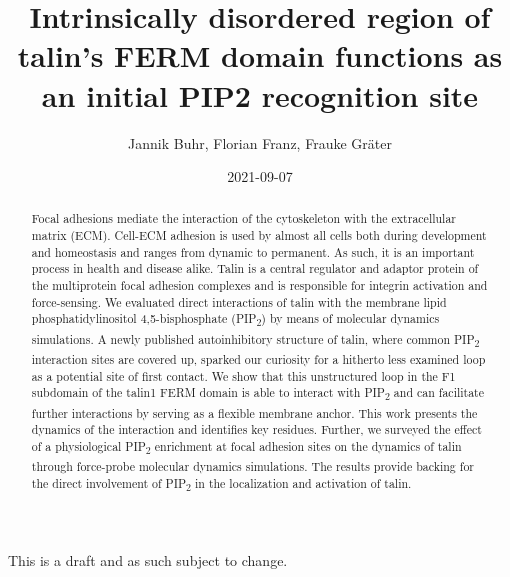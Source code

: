 \documentclass[
  letterpaper,
  DIV=11,
  numbers=noendperiod]{scrartcl}
\title{Intrinsically disordered region of talin's FERM domain functions
as an initial PIP2 recognition site}
\author{Jannik Buhr, Florian Franz, Frauke Gräter}
\date{2021-09-07}
\begin{document}
\maketitle
\begin{abstract}
Focal adhesions mediate the interaction of the cytoskeleton with the
extracellular matrix (ECM). Cell-ECM adhesion is used by almost all
cells both during development and homeostasis and ranges from dynamic to
permanent. As such, it is an important process in health and disease
alike. Talin is a central regulator and adaptor protein of the
multiprotein focal adhesion complexes and is responsible for integrin
activation and force-sensing. We evaluated direct interactions of talin
with the membrane lipid phosphatidylinositol 4,5-bisphosphate
(PIP\textsubscript{2}) by means of molecular dynamics simulations. A
newly published autoinhibitory structure of talin, where common
PIP\textsubscript{2} interaction sites are covered up, sparked our
curiosity for a hitherto less examined loop as a potential site of first
contact. We show that this unstructured loop in the F1 subdomain of the
talin1 FERM domain is able to interact with PIP\textsubscript{2} and can
facilitate further interactions by serving as a flexible membrane
anchor. This work presents the dynamics of the interaction and
identifies key residues. Further, we surveyed the effect of a
physiological PIP\textsubscript{2} enrichment at focal adhesion sites on
the dynamics of talin through force-probe molecular dynamics
simulations. The results provide backing for the direct involvement of
PIP\textsubscript{2} in the localization and activation of talin.
\end{abstract}

\begin{tcolorbox}[standard jigsaw,coltitle=black, titlerule=0mm, left=2mm, title=\textcolor{quarto-callout-warning-color}{\faExclamationTriangle}\hspace{0.5em}Warning, arc=.35mm, bottomtitle=1mm, colframe=quarto-callout-warning-color-frame, toptitle=1mm, bottomrule=.15mm, toprule=.15mm, colback=white, opacityback=0, rightrule=.15mm, leftrule=.75mm, opacitybacktitle=0.6, colbacktitle=quarto-callout-warning-color!10!white]
This is a draft and as such subject to change.
\end{tcolorbox}
\end{document}
